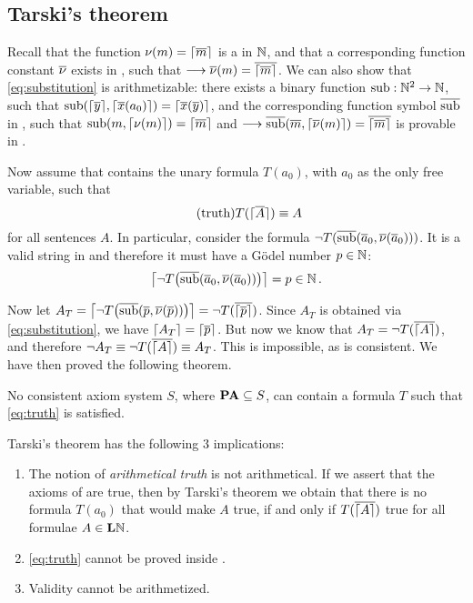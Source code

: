 \documentclass[11pt,a4paper]{article}
\begin{document}
\subsection{Tarski's theorem}

Recall that the function \(\nu(m) = \G{\num m}\) is a \PRF{} in \(\Nset\),
and that a corresponding function constant \(\num\nu\) exists in \PA{},
such that \(\seq\num\nu(m) = \num{\G{\num m}}\). We can also show that
\eqref{eq:substitution} is arithmetizable: there exists a binary function
\(\sub:\Nset^2\to\Nset\), such that
\(\sub(\G{\num y},\G{\num x(a_0)})=\G{\num x(\num y)}\),
and the corresponding function symbol \(\num\sub\) in \PA,
such that \(\sub(m,\G{\nu(m)})=\G{\num m}\) and
\(\seq\num\sub(\num m,\G{\num\nu(m)})=\num{\G{\num m}}\)
is provable in \PA{}.

Now assume that \PA{} contains the unary formula \(T(a_0)\),
with \(a_0\) as the only free variable, such that
\begin{equation}\tag{truth}\label{eq:truth}
   T(\G{\num A})\equiv A
\end{equation}
for all sentences \(A\).
In particular, consider the formula  \(\lnot T(\num\sub(\num a_0, \num\nu(\num a_0)))\).
It is a valid string in \PA{} and therefore it must have a Gödel number \(p\in\Nset\):
\begin{equation*}
    \G*{\lnot T\arcs*{\num\sub\arcs*{\num a_0, \num\nu(\num a_0)}}} = p\in\Nset\,.
\end{equation*}

Now let \(A_T =\G*{\lnot T\arcs*{\num\sub\arcs*{\num p, \num\nu(\num p)}}} = \lnot T(\num{\G*{\num p}})\).
Since \(A_T\) is obtained via \eqref{eq:substitution}, we have
\(\G{A_T} = \G*{\num p}\). But now we know that \(A_T = \lnot T\arcs{\num{\G{A}}}\),
and therefore \(\lnot A_T\equiv\lnot T\arcs{\num{\G{A}}}\equiv A_T\).
This is impossible, as \PA{} is consistent.
We have then proved the following theorem.

\begin{theorem}[Tarski]\label{the:Tarski}
    No consistent axiom system \(S\), where \(\PA\subseteq S\),
    can contain a formula \(T\) such that \eqref{eq:truth} is satisfied.
\end{theorem}

Tarski's theorem has the following \(3\) implications:
\begin{enumerate}
    \item
        The notion of \emph{arithmetical truth} is not arithmetical.
        If we assert that the axioms of \PA{} are true,
        then by Tarski's theorem we obtain that there is no formula
        \(T(a_0)\) that would make \(A\) true, if and only if \(T(\num{\G A})\)
        true for all formulae \(A\in\LN\).
    \item
        \eqref{eq:truth} cannot be proved inside \PA{}.
    \item
        Validity cannot be arithmetized.
\end{enumerate}
\end{document}
